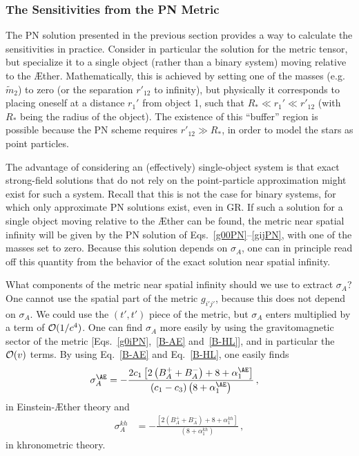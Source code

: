 \documentclass[prd,aps,twocolumn,nofootinbib,showpacs,superscriptaddress]{revtex4-1}
\def\kh{{kh}}
\begin{document}
\subsubsection{The Sensitivities from the PN Metric}

The PN solution presented in the previous section provides a way to calculate the sensitivities in practice. 
Consider in particular the solution for the metric tensor, but specialize it to a single 
object (rather than a binary system) moving relative to the \AE ther. Mathematically, this is achieved by setting one 
of the masses (e.g.~$\tilde{m}_2$) to zero (or the separation $r'_{12}$ to infinity), but physically it corresponds to 
placing oneself at a distance $r_1'$ from object 1, such that $R_*\ll r_1'\ll r'_{12}$ (with $R_*$ being the radius of the object). The existence of this ``buffer''
region is possible because the PN scheme requires $r'_{12}\gg R_*$, in order to model the stars as point particles.

The advantage of considering an (effectively) single-object system is 
that exact strong-field solutions that do not rely on the point-particle approximation might exist  for such a system.
Recall that this is not the case for binary systems, for which only approximate PN solutions exist, 
even in GR. If such a solution for a single object 
moving relative to the \AE ther can be found, the metric near spatial infinity will be given by
the PN solution of Eqs.~\eqref{g00PN}--\eqref{gijPN}, with one of the masses set to zero. Because this solution depends on $\sigma_{A}$,
one can in principle read off this quantity from the behavior of the exact solution near spatial infinity.

What components of the metric near spatial infinity should we use to extract $\sigma_{A}$? 
One cannot use the spatial part of the metric $g_{i'j'}$, because this does not depend on $\sigma_{A}$. 
We could use the $(t',t')$ piece of the metric, but $\sigma_{A}$ enters multiplied by a term of ${\cal{O}}(1/c^{4})$. One can find $\sigma_{A}$ more easily by using the gravitomagnetic sector of the metric 
[Eqs.~\eqref{g0iPN},~\eqref{B-AE} and~\eqref{B-HL}], and in particular the ${\cal O}(v)$ terms. 
By using Eq.~\eqref{B-AE} and Eq.~\eqref{B-HL}, one easily finds
%
\begin{align}
\label{sigmaA-def-EA}
\sigma_{A}^{\AE} &= -\frac{2 c_{1} \left[2\left(B^{+}_{A} + B^{-}_{A}\right) + 8 + \alpha_{1}^{\AE}\right]}{\left(c_{1} - c_{3}\right) \left(8 + \alpha_{1}^{\AE}\right)}\,,
\end{align}
in Einstein-\AE ther theory and
\begin{align}
\label{sigmaA-def-HL}
\sigma_{A}^{\kh} &= -\frac{\left[2\left(B^{+}_{A} + B^{-}_{A}\right) + 8 + \alpha_{1}^{\kh}\right]}{\left(8 + \alpha_{1}^{\kh}\right)}\,,
\end{align}
%
in khronometric theory. 
\end{document}
